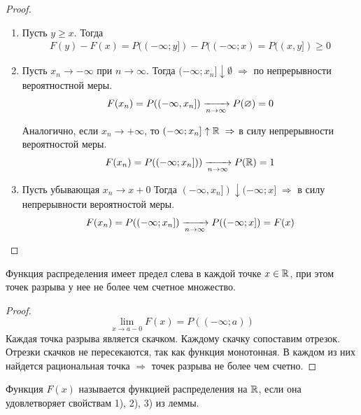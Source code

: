 \begin{proof}~

	\begin{enumerate}
		\item 
			Пусть $y \geq x$. Тогда
			\begin{align*}
				F(y) - F(x) = P((-\infty; y]) - P((-\infty; x) = P((x, y]) \geq 0
			\end{align*}

		\item 
			Пусть $x_n \rightarrow -\infty$ при $n \rightarrow \infty$. 
			Тогда $(-\infty; x_n] \downarrow \emptyset\; \Rightarrow$ по непрерывности вероятностной меры.
			\begin{align*}
				F(x_n) = P((-\infty, x_n]) \xrightarrow[n \to \infty]{} P(\varnothing) = 0
			\end{align*}

			Аналогично, если $x_n \to +\infty$, то $(-\infty; x_n] \uparrow \mathbb{R}\; \Rightarrow$ 
			в силу непрерывности вероятностой меры.
			\begin{align*}
				F(x_n) = P((-\infty; x_n])) \xrightarrow[n \to \infty]{} P(\mathbb{R}) = 1
			\end{align*}

		\item 
			Пусть убывающая $x_n \to x + 0$ Тогда $(-\infty, x_n]) \downarrow (-\infty; x]\; \Rightarrow$ 
			в силу непрерывности вероятностой меры.
			\begin{align*}
				F(x_n) = P((-\infty; x_n]) \xrightarrow[n \to \infty]{} P((-\infty; x]) = F(x)
			\end{align*}
	\end{enumerate}
\end{proof}

\begin{corollary}
	Функция распределения имеет предел слева в каждой точке $x \in \mathbb{R}$, при этом точек разрыва у нее не более чем счетное множество.

	\begin{proof}
		$$\lim_{x \to a-0} F(x) = P((-\infty; a))$$
		Каждая точка разрыва является скачком. Каждому скачку сопоставим отрезок.
		Отрезки скачков не пересекаются, так как функция монотонная. 
		В каждом из них найдется рациональная точка $\Rightarrow$ точек разрыва не более чем счетно.
	\end{proof}
\end{corollary}

\begin{definition}
	Функция $F(x)$ называется функцией распределения на $\mathbb{R}$, если она удовлетворяет свойствам 
	1), 2), 3) из леммы.
\end{definition}

